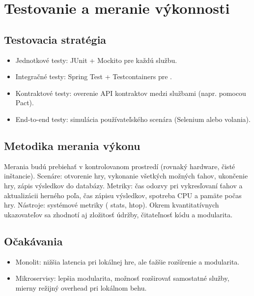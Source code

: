 \section{Testovanie a meranie výkonnosti}
\subsection{Testovacia stratégia}
\begin{itemize}
    \item Jednotkové testy: JUnit + Mockito pre každú službu.
    \item Integračné testy: Spring Test + Testcontainers pre .
    \item Kontraktové testy: overenie API kontraktov medzi službami (napr. pomocou Pact).
    \item End-to-end testy: simulácia používateľského scenára (Selenium alebo  volania).
\end{itemize}

\subsection{Metodika merania výkonu}
Merania budú prebiehať v kontrolovanom prostredí (rovnaký hardware, čisté inštancie). Scenáre: otvorenie hry, vykonanie všetkých možných ťahov, ukončenie hry, zápis výsledkov do databázy. Metriky: čas odozvy pri vykresľovaní ťahov a aktualizácii herného poľa, čas zápisu výsledkov, spotreba CPU a pamäte počas hry. Nástroje: systémové metriky ( stats, htop). Okrem kvantitatívnych ukazovateľov sa zhodnotí aj zložitosť údržby, čitateľnosť kódu a modularita.

\subsection{Očakávania}
\begin{itemize}
    \item Monolit: nižšia latencia pri lokálnej hre, ale ťažšie rozšírenie a modularita.
    \item Mikroservisy: lepšia modularita, možnosť rozširovať samostatné služby, mierny režijný overhead pri lokálnom behu.
\end{itemize}

